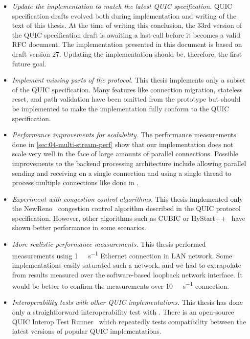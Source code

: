 \begin{itemize}

  \item \textit{Update the implementation to match the latest QUIC specification.} QUIC
specification drafts evolved both during implementation and writing of the text of this thesis. At
the time of writing this conclusion, the 33rd version of the QUIC specification draft is awaiting a
last-call before it becomes a valid RFC document. The implementation presented in this document is
based on draft version 27. Updating the implementation should be, therefore, the first future goal.

  \item \textit{Implement missing parts of the protocol.} This thesis implements only a subset of
the QUIC specification. Many features like connection migration, stateless reset, and path
validation have been omitted from the prototype but should be implemented to make the implementation
fully conform to the QUIC specification.

  \item \textit{Performance improvements for scalability.} The performance measurements done in
\autoref{sec:04-multi-stream-perf} show that our implementation does not scale very well in the face
of large amounts of parallel connections. Possible improvements to the backend processing
architecture include allowing parallel sending and receiving on a single connection and using a
single thread to process multiple connections like done in \libmsquic{}.

  \item \textit{Experiment with congestion control algorithms.} This thesis implemented only the
NewReno~\autocite[Section~7]{draft-ietf-quic-recovery} congestion control algorithm described in the
QUIC protocol specification. However, other algorithms such as CUBIC or
HyStart++~\cite{cloudflareCubic} have shown better performance in some scenarios.

  \item \textit{More realistic performance measurements.} This thesis performed measurements using
\SI[per-mode=symbol]{1}{\giga\bit\per\second} Ethernet connection in LAN network. Some
implementations easily saturated such a network, and we had to extrapolate from results measured
over the software-based loopback network interface. It would be better to confirm the measurements
over \SI[per-mode=symbol]{10}{\giga\bit\per\second} connection.

  \item \textit{Interoperability tests with other QUIC implementations.} This thesis has done only a
straightforward interoperability test with \libmsquic{}. There is an open-source QUIC Interop Test
Runner~\cite{QuicInteropRunner} which repeatedly tests compatibility between the latest versions of
popular QUIC implementations.

\end{itemize}

